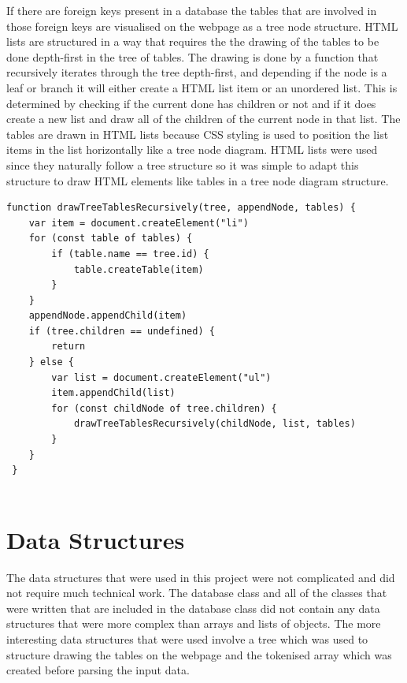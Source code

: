 If there are foreign keys present in a database the tables that are involved in those foreign keys are visualised on the webpage as a tree node structure. HTML lists are structured in a way that requires the the drawing of the tables to be done depth-first in the tree of tables. The drawing is done by a function that recursively iterates through the tree depth-first, and depending if the node is a leaf or branch it will either create a HTML list item or an unordered list. This is determined by checking if the current done has children or not and if it does create a new list and draw all of the children of the current node in that list. The tables are drawn in HTML lists because CSS styling is used to position the list items in the list horizontally like a tree node diagram. HTML lists were used since they naturally follow a tree structure so it was simple to adapt this structure to draw HTML elements like tables in a tree node diagram structure. 

 \begin{lstlisting}[style=JavaScript, caption={JavaScript function draw a list of tables recursively while also creating HTML list elements to be structured on the webpage.}]
 function drawTreeTablesRecursively(tree, appendNode, tables) {
 	var item = document.createElement("li")
 	for (const table of tables) {
 		if (table.name == tree.id) {
 			table.createTable(item)
 		}
 	}
 	appendNode.appendChild(item)
 	if (tree.children == undefined) {
 		return
 	} else {
 		var list = document.createElement("ul")
 		item.appendChild(list)
 		for (const childNode of tree.children) {
 			drawTreeTablesRecursively(childNode, list, tables)
 		}
 	}
 }
 
 \end{lstlisting}

\section{Data Structures}

The data structures that were used in this project were not complicated and did not require much technical work. The database class and all of the classes that were written that are included in the database class did not contain any data structures that were more complex than arrays and lists of objects. The more interesting data structures that were used involve a tree which was used to structure drawing the tables on the webpage and the tokenised array which was created before parsing the input data.


